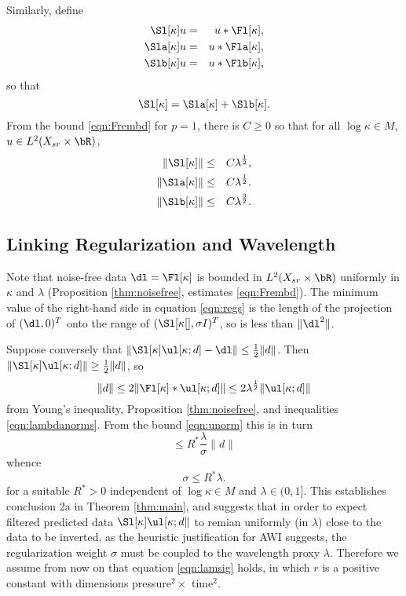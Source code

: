 Similarly, define
\begin{eqnarray}
  \label{eqn:sdeflam}
  \Sl[\kappa]u &=& u *\Fl[\kappa],  \nonumber \\
  \Sla[\kappa]u &=& u *\Fla[\kappa], \nonumber\\
  \Slb[\kappa]u &=& u *\Flb[\kappa], 
\end{eqnarray}
so that
\[
  \Sl[\kappa] = \Sla[\kappa] + \Slb[\kappa].
\]
From the bound \ref{eqn:Frembd} for $p=1$, there is $C \ge 0$ so that
for all $\log \kappa \in M$, $u \in L^2(X_{sr} \times \bR)$,
\begin{eqnarray}
  \label{eqn:Srembd}
  \|\Sl[\kappa]\| &\le&  C\lambda^{\frac{1}{2}},\nonumber \\
  \|\Sla[\kappa]\|& \le& C\lambda^{\frac{1}{2}}. \nonumber \\
  \|\Slb[\kappa]\| & \le& C\lambda^{\frac{3}{2}}.
\end{eqnarray}

\subsection{Linking Regularization and Wavelength}
Note that noise-free data $\dl = \Fl[\kappa]$ is bounded in $L^2(X_{sr}
\times \bR)$ uniformly in $\kappa$ and $\lambda$  (Proposition
\ref{thm:noisefree}, estimates \ref{eqn:Frembd}). 
The minimum value of the right-hand side in equation \ref{eqn:regs} is
the length of the projection of $(\dl,0)^T$ onto the range of
$(\Sl[\kappa[],\sigma I)^T$, so is less than $\|\dl^2\|$.

Suppose conversely that $\|\Sl[\kappa]\ul[\kappa;d] - \dl\| \le
\frac{1}{2}\|d\|$. Then $\|\Sl[\kappa]\ul[\kappa;d] \| \ge
\frac{1}{2}\|d\|$, so
\[
  \|d\| \le 2\|\Fl[\kappa]*\ul[\kappa;d] \| \le
  2\lambda^{\frac{1}{2}}\|\ul[\kappa;d]\|
\]
from Young's inequality, Proposition \ref{thm:noisefree}, and
inequalities \ref{eqn:lambdanorms}. From the bound \ref{eqn:unorm} this is in
turn
\[
  \le R^* \frac{\lambda}{\sigma} \|d\|
\]
whence
\[
  \sigma \le R^* \lambda.
\]
for a suitable $R^*>0$ independent of $\log \kappa \in M$ and $\lambda
\in (0,1]$. This establishes conclusion 2a in Theorem \ref{thm:main}, and
suggests that in order to expect filtered predicted data
$\Sl[\kappa]\ul[\kappa;d\|$ to remian uniformly (in $\lambda$) close to the data to be
inverted, as the heuristic justification for AWI suggests, the
regularization weight $\sigma$ must be coupled to the wavelength proxy
$\lambda$. Therefore we assume from now on that equation
\ref{eqn:lamsig} holds,  
in which $r$ is a positive constant with dimensions pressure$^2 \times 
$ time$^2$.

